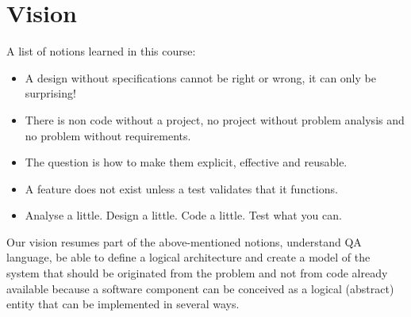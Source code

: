 \section{Vision}
A list of notions learned in this course:
\begin{itemize}
	\item A design without specifications cannot be right or wrong, it can only be surprising!
	\item There is non code without a project, no project without problem analysis and no problem without requirements.
	\item The question is how to make them explicit, effective and reusable.
	\item A feature does not exist unless a test validates that it functions.
	\item Analyse a little. Design a little. Code a little. Test what you can.
\end{itemize}
Our vision resumes part of the above-mentioned notions, understand QA language, be able to define a logical architecture and create a model of the system that should be originated from the problem and not from code already available because a software component can be conceived as a logical (abstract) entity that can be implemented in several ways.